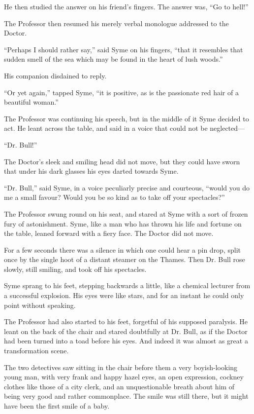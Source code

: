\documentclass{book}
\begin{document}
He then studied the answer on his friend’s fingers. The answer was, “Go to hell!”

The Professor then resumed his merely verbal monologue addressed to the Doctor.

“Perhaps I should rather say,” said Syme on his fingers, “that it resembles that sudden smell of the sea which may be found in the heart of lush woods.”

His companion disdained to reply.

“Or yet again,” tapped Syme, “it is positive, as is the passionate red hair of a beautiful woman.”

The Professor was continuing his speech, but in the middle of it Syme decided to act. He leant across the table, and said in a voice that could not be neglected—

“Dr. Bull!”

The Doctor’s sleek and smiling head did not move, but they could have sworn that under his dark glasses his eyes darted towards Syme.

“Dr. Bull,” said Syme, in a voice peculiarly precise and courteous, “would you do me a small favour? Would you be so kind as to take off your spectacles?”

The Professor swung round on his seat, and stared at Syme with a sort of frozen fury of astonishment. Syme, like a man who has thrown his life and fortune on the table, leaned forward with a fiery face. The Doctor did not move.

For a few seconds there was a silence in which one could hear a pin drop, split once by the single hoot of a distant steamer on the Thames. Then Dr. Bull rose slowly, still smiling, and took off his spectacles.

Syme sprang to his feet, stepping backwards a little, like a chemical lecturer from a successful explosion. His eyes were like stars, and for an instant he could only point without speaking.

The Professor had also started to his feet, forgetful of his supposed paralysis. He leant on the back of the chair and stared doubtfully at Dr. Bull, as if the Doctor had been turned into a toad before his eyes. And indeed it was almost as great a transformation scene.

The two detectives saw sitting in the chair before them a very boyish-looking young man, with very frank and happy hazel eyes, an open expression, cockney clothes like those of a city clerk, and an unquestionable breath about him of being very good and rather commonplace. The smile was still there, but it might have been the first smile of a baby.
\end{document}
